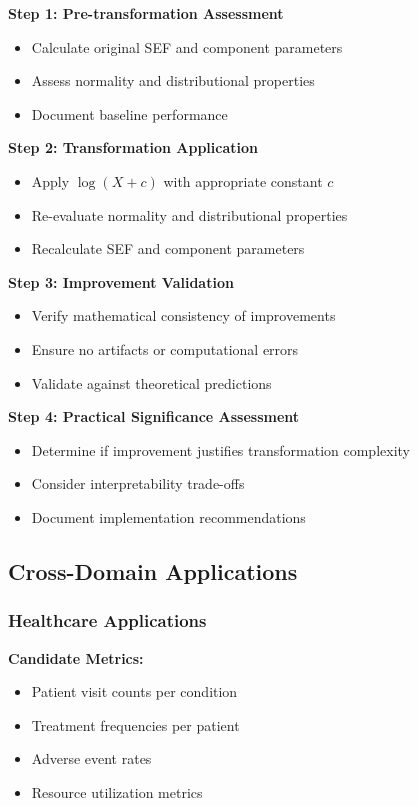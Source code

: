\textbf{Step 1: Pre-transformation Assessment}
\begin{itemize}
    \item Calculate original SEF and component parameters
    \item Assess normality and distributional properties
    \item Document baseline performance
\end{itemize}

\textbf{Step 2: Transformation Application}
\begin{itemize}
    \item Apply $\log(X + c)$ with appropriate constant $c$
    \item Re-evaluate normality and distributional properties
    \item Recalculate SEF and component parameters
\end{itemize}

\textbf{Step 3: Improvement Validation}
\begin{itemize}
    \item Verify mathematical consistency of improvements
    \item Ensure no artifacts or computational errors
    \item Validate against theoretical predictions
\end{itemize}

\textbf{Step 4: Practical Significance Assessment}
\begin{itemize}
    \item Determine if improvement justifies transformation complexity
    \item Consider interpretability trade-offs
    \item Document implementation recommendations
\end{itemize}

\subsection{Cross-Domain Applications}

\subsubsection{Healthcare Applications}

\textbf{Candidate Metrics:}
\begin{itemize}
    \item Patient visit counts per condition
    \item Treatment frequencies per patient
    \item Adverse event rates
    \item Resource utilization metrics
\end{itemize}

